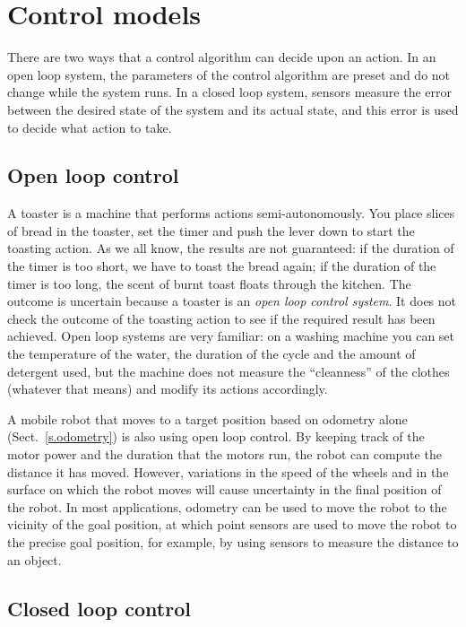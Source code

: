 \section{Control models}\label{s.control-model}

There are two ways that a control algorithm can decide upon an action. In an open loop system, the parameters of the control algorithm are preset and do not change while the system runs. In a closed loop system, sensors measure the error between the desired state of the system and its actual state, and this error is used to decide what action to take.

\subsection{Open loop control}

A toaster is a machine that performs actions semi-autonomously. You place slices of bread in the toaster, set the timer and push the lever down to start the toasting action. As we all know, the results are not guaranteed: if the duration of the timer is too short, we have to toast the bread again; if the duration of the timer is too long, the scent of burnt toast floats through the kitchen. The outcome is uncertain because a toaster is an \emph{open loop control system}. It does not check the outcome of the toasting action to see if the required result has been achieved. Open loop systems are very familiar: on a washing machine you can set the temperature of the water, the duration of the cycle and the amount of detergent used, but the machine does not measure the ``cleanness'' of the clothes (whatever that means) and modify its actions accordingly.

A mobile robot that moves to a target position based on odometry alone (Sect.~\ref{s.odometry}) is also using open loop control. By keeping track of the motor power and the duration that the motors run, the robot can compute the distance it has moved. However, variations in the speed of the wheels and in the surface on which the robot moves will cause uncertainty in the final position of the robot. In most applications, odometry can be used to move the robot to the vicinity of the goal position, at which point sensors are used to move the robot to the precise goal position, for example, by using sensors to measure the distance to an object.

\subsection{Closed loop control}


